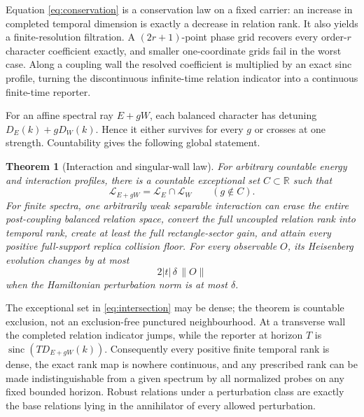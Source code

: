 \documentclass[10pt]{article}
\newtheorem{theorem}{Theorem}
\theoremstyle{definition}
\newcommand{\R}{\mathbb R}
\newcommand{\Rel}{\mathcal L}
\newcommand{\sinc}{\operatorname{sinc}}
\begin{document}
Equation \eqref{eq:conservation} is a conservation law on a fixed carrier:
an increase in completed temporal dimension is exactly a decrease in
relation rank.  It also yields a finite-resolution filtration.  A
$(2r+1)$-point phase grid recovers every order-$r$ character coefficient
exactly, and smaller one-coordinate grids fail in the worst case.  Along a
coupling wall the resolved coefficient is multiplied by an exact sinc
profile, turning the discontinuous infinite-time relation indicator into a
continuous finite-time reporter.

For an affine spectral ray $E+gW$, each balanced character has detuning
$D_E(k)+gD_W(k)$.  Hence it either survives for every $g$ or crosses at
one strength.  Countability gives the following global statement.

\begin{theorem}[Interaction and singular-wall law]
\label{thm:interaction}
For arbitrary countable energy and interaction profiles, there is a
countable exceptional set $C\subset\R$ such that
\begin{equation}
 \Rel_{E+gW}=\Rel_E\cap\Rel_W\qquad(g\notin C).         \label{eq:intersection}
\end{equation}
For finite spectra, one arbitrarily weak separable interaction can erase the
entire post-coupling balanced relation space, convert the full uncoupled
relation rank into temporal rank, create at least the full rectangle-sector
gain, and attain every positive full-support replica collision floor.  For
every observable $O$, its Heisenberg evolution changes by at most
\begin{equation}
 2|t|\,\delta\,\|O\|                                  \label{eq:duhamel}
\end{equation}
when the Hamiltonian perturbation norm is at most $\delta$.
\end{theorem}

The exceptional set in \eqref{eq:intersection} may be dense; the theorem is
countable exclusion, not an exclusion-free punctured neighbourhood.  At a
transverse wall the completed relation indicator jumps, while the reporter
at horizon $T$ is $\sinc(TD_{E+gW}(k))$.  Consequently every positive
finite temporal rank is dense, the exact rank map is nowhere continuous,
and any prescribed rank can be made indistinguishable from a given spectrum
by all normalized probes on any fixed bounded horizon.  Robust relations
under a perturbation class are exactly the base relations lying in the
annihilator of every allowed perturbation.
\end{document}

